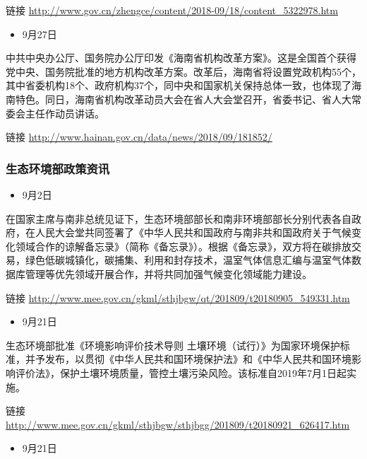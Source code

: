 \documentclass[]{book}
\providecommand{\tightlist}{%
  \setlength{\itemsep}{0pt}\setlength{\parskip}{0pt}}
\begin{document}
链接
\url{http://www.gov.cn/zhengce/content/2018-09/18/content_5322978.htm}

\begin{itemize}
\tightlist
\item
  9月27日
\end{itemize}

中共中央办公厅、国务院办公厅印发《海南省机构改革方案》。这是全国首个获得党中央、国务院批准的地方机构改革方案。改革后，海南省将设置党政机构55个，其中省委机构18个、政府机构37个，同中央和国家机关保持总体一致，也体现了海南特色。同日，海南省机构改革动员大会在省人大会堂召开，省委书记、省人大常委会主任作动员讲话。

链接 \url{http://www.hainan.gov.cn/data/news/2018/09/181852/}

\subsubsection*{生态环境部政策资讯}\label{-5}

\begin{itemize}
\tightlist
\item
  9月2日
\end{itemize}

在国家主席与南非总统见证下，生态环境部部长和南非环境部部长分别代表各自政府，在人民大会堂共同签署了《中华人民共和国政府与南非共和国政府关于气候变化领域合作的谅解备忘录》（简称《备忘录》）。根据《备忘录》，双方将在碳排放交易，绿色低碳城镇化，碳捕集、利用和封存技术，温室气体信息汇编与温室气体数据库管理等优先领域开展合作，并将共同加强气候变化领域能力建设。

链接
\url{http://www.mee.gov.cn/gkml/sthjbgw/qt/201809/t20180905_549331.htm}

\begin{itemize}
\tightlist
\item
  9月21日
\end{itemize}

生态环境部批准《环境影响评价技术导则
土壤环境（试行）》为国家环境保护标准，并予发布，以贯彻《中华人民共和国环境保护法》和《中华人民共和国环境影响评价法》，保护土壤环境质量，管控土壤污染风险。该标准自2019年7月1日起实施。

链接
\url{http://www.mee.gov.cn/gkml/sthjbgw/sthjbgg/201809/t20180921_626417.htm}

\begin{itemize}
\tightlist
\item
  9月21日
\end{itemize}
\end{document}
